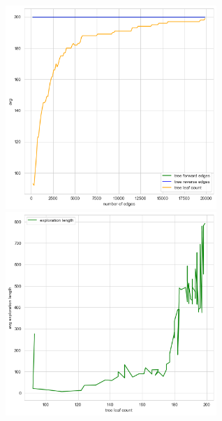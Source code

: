 \documentclass{article}
\begin{document}
\begin{figure}
  \includegraphics[width=8cm]{figures/random_uj/edge_tree.png}
  \hspace{1cm}
  \includegraphics[width=8cm]{figures/random_uj/leaf_expl.png}
  \vspace{1cm}


\end{figure}
\end{document}
